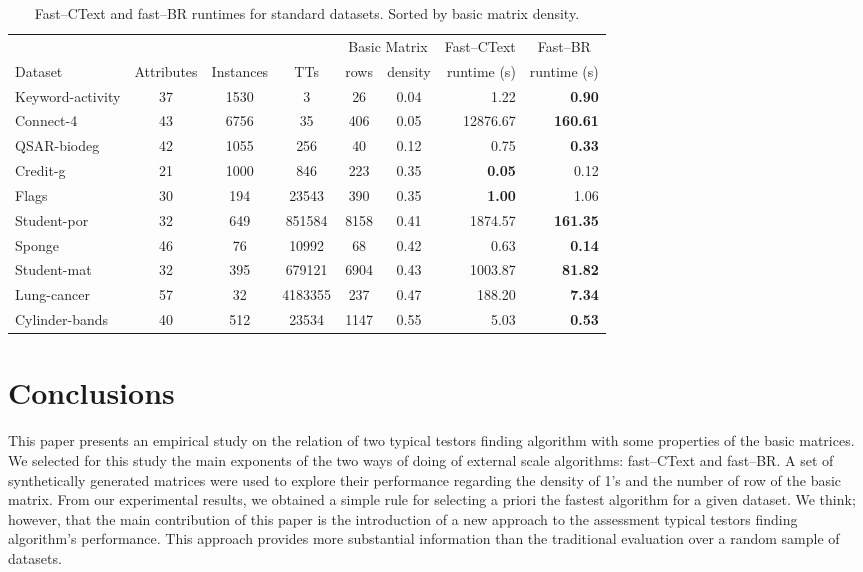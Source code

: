 \documentclass[citeauthoryear]{llncs}
\begin{document}
	\begin{table}[htb]
		\centering \footnotesize
		\caption{Fast--CText and fast--BR runtimes for standard datasets. Sorted by basic matrix density.}
		\label{tab:density}
		\begin{tabular}{lcccccrr}
			\hline
			&&&& \multicolumn{2}{c}{Basic Matrix} &  \multicolumn{1}{c}{Fast--CText} & \multicolumn{1}{c}{Fast--BR} \\
			\cline{5-6}
			Dataset   		 & Attributes & Instances & TTs     & rows  & density & runtime (s) & runtime (s) \\
			\hline
			Keyword-activity & 37         & 1530      & 3        & 26    & 0.04    & 1.22             & \textbf{0.90}   \\
			Connect-4        & 43         & 6756      & 35       & 406   & 0.05    & 12876.67         & \textbf{160.61} \\
			QSAR-biodeg      & 42         & 1055      & 256      & 40    & 0.12    & 0.75             & \textbf{0.33}   \\
			Credit-g         & 21         & 1000      & 846      & 223   & 0.35    & \textbf{0.05}    & 0.12            \\
			Flags            & 30         & 194       & 23543    & 390   & 0.35    & \textbf{1.00}    & 1.06            \\
			Student-por      & 32         & 649       & 851584   & 8158  & 0.41    & 1874.57          & \textbf{161.35} \\
			Sponge           & 46         & 76        & 10992    & 68    & 0.42    & 0.63             & \textbf{0.14}   \\
			Student-mat      & 32         & 395       & 679121   & 6904  & 0.43    & 1003.87          & \textbf{81.82}  \\
			Lung-cancer      & 57         & 32        & 4183355  & 237   & 0.47    & 188.20           & \textbf{7.34}   \\
			Cylinder-bands   & 40         & 512       & 23534    & 1147  & 0.55    & 5.03             & \textbf{0.53}   \\
			\hline
		\end{tabular}
	\end{table}
%
%
\section{Conclusions}
%
 This paper presents an empirical study on the relation of two typical testors finding algorithm with some properties of the basic matrices. We selected for this study the main exponents of the two ways of doing of external scale algorithms: fast--CText and fast--BR. A set of synthetically generated matrices were used to explore their performance regarding the density of 1's and the number of row of the basic matrix. From our experimental results, we obtained a simple rule for selecting a priori the fastest algorithm for a given dataset. We think; however, that the main contribution of this paper is the introduction of a new approach to the assessment typical testors finding algorithm's performance. This approach provides more substantial information than the traditional evaluation over a random sample of datasets.
 
\end{document}
